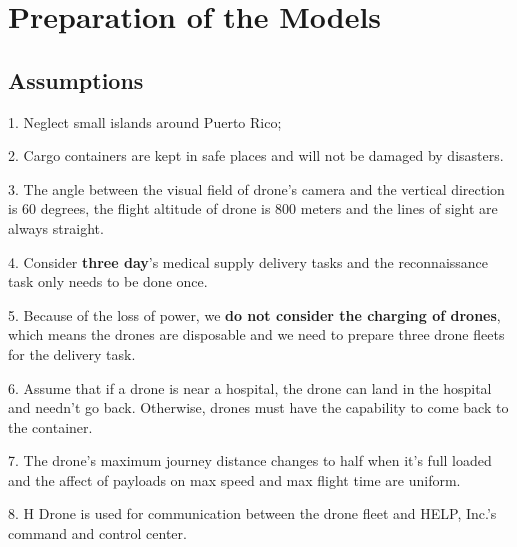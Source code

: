 \documentclass{mcmthesis}
\begin{document}
%    

    
     \section{Preparation of the Models}
    \subsection{Assumptions}
    1. Neglect small islands around Puerto Rico; \label{as1}
    
    2. Cargo containers are kept in safe places and will not be damaged by disasters. \label{as2}
    
    3. The angle between the visual field of drone's camera and the vertical direction is 60 degrees, the flight altitude of drone is 800 meters and the lines of sight are always straight.  \label{as3}
    
    4. Consider \textbf{three day}'s medical supply delivery tasks and the reconnaissance task only needs to be done once.\label{as4}
    
    5. Because of the loss of power, we \textbf{do not consider the charging of drones}, which means the drones are disposable and we need to prepare three drone fleets for the delivery task.  \label{as5}
    
    6. Assume that if a drone is near a hospital, the drone can land in the hospital and needn't go back. Otherwise, drones must have the capability to come back to the container. \label{as6}
    
    7. The drone's maximum journey distance changes to half when it's full loaded and the affect of payloads on max speed and max flight time are uniform. \label{as7}
    
    8. H Drone is used for communication between the drone fleet and HELP, Inc.'s command and control center.
\end{document}
